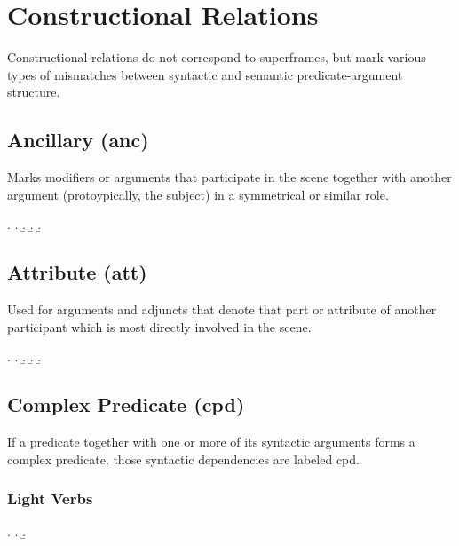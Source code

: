 \documentclass[a4paper]{article}
\begin{document}
\clearpage
\section{Constructional Relations}

Constructional relations do not correspond to superframes, but mark various
types of mismatches between syntactic and semantic predicate-argument
structure.

\subsection{Ancillary (\textsf{anc})}
\label{sec:anc}

Marks modifiers or arguments that participate in the scene together with
another argument (protoypically, the subject) in a symmetrical or similar role.

\ex.
\a. 
\b. 
\b. 
\b. 

\clearpage
\subsection{Attribute (\textsf{att})}
\label{sec:att}

Used for arguments and adjuncts that denote that part or attribute of another
participant which is most directly involved in the scene.

\ex.
\a. 
\b. 
\b. 
\b. 

\clearpage
\subsection{Complex Predicate (\textsf{cpd})}
\label{sec:cpd}

If a predicate together with one or more of its syntactic arguments forms a
complex predicate, those syntactic dependencies are labeled \textsf{cpd}.

\subsubsection{Light Verbs}

\ex.
\a. 
\b. 
\end{document}

